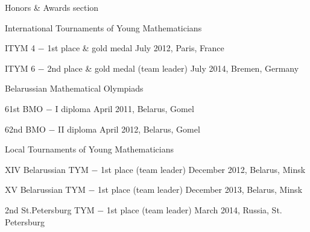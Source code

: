 \documentclass{resume} %
\begin{document}

\begin{rSection}{Honors \& Awards section}

\begin{rSubsection}{International Tournaments of Young Mathematicians}{}{}

\item ITYM 4 $-$ 1st place \& gold medal \hfill July 2012, Paris, France
\item ITYM 6 $-$ 2nd place \& gold medal (team leader) \hfill July 2014, Bremen, Germany

\end{rSubsection}

\begin{rSubsection}{Belarussian Mathematical Olympiads}{}{}

\item 61st BMO $-$ I diploma \hfill  April 2011, Belarus, Gomel
\item 62nd BMO $-$ II diploma \hfill April 2012, Belarus, Gomel
\end{rSubsection}


\begin{rSubsection}{Local Tournaments of Young Mathematicians}{}{}

\item XIV Belarussian TYM $-$ 1st place (team leader) \hfill December 2012, Belarus, Minsk
\item XV Belarussian TYM $-$ 1st place (team leader) \hfill December 2013, Belarus, Minsk
\item 2nd St.Petersburg TYM $-$ 1st place (team leader) \hfill March 2014, Russia, St. Petersburg
\end{rSubsection}

\end{rSection}
\end{document}
